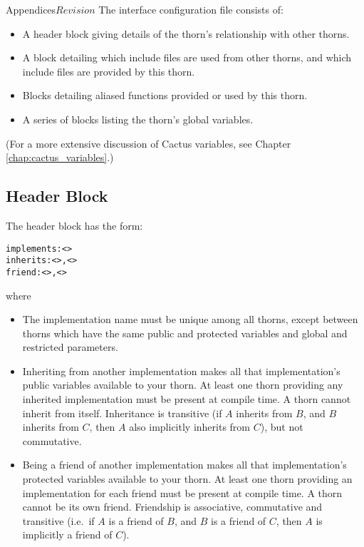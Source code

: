 \begin{cactuspart}{Appendices}{}{$Revision$}
The interface configuration file consists of:
\begin{itemize}
\item A header block giving details of the thorn's relationship with
other thorns.
\item A block detailing which include files are used from other
thorns, and which include files are provided by this thorn.
\item Blocks detailing aliased functions provided or used by this thorn.
\item A series of blocks listing the thorn's global variables.
\end{itemize}
(For a more extensive discussion of Cactus variables, see Chapter
\ref{chap:cactus_variables}.)

\subsection{Header Block}
The header block has the form:
\begin{alltt}
implements: <>
inherits: <>, <>
friend: <>, <>
\end{alltt}
where
\begin{itemize}
\item{} The implementation name must be unique among all thorns, except
        between thorns which have the same public and protected variables and
        global and restricted parameters.
\item{} Inheriting from another implementation makes all that implementation's
        public variables available to your thorn. At least one thorn
        providing any inherited implementation must be present at compile time.
        A thorn cannot inherit from itself. Inheritance is transitive
	(if $A$ inherits from $B$, and $B$ inherits from $C$, then
	$A$ also implicitly inherits from $C$),
	but not commutative.
\item{} Being a friend of another implementation makes all that
        implementation's protected variables available to your thorn.
	At least one thorn providing an implementation for each friend
	must be present at compile time.
	A thorn cannot be its own friend.
	Friendship is associative,
	commutative
	and transitive (i.e.~if $A$ is a friend of $B$,
	and $B$ is a friend of $C$, then $A$ is implicitly a friend of $C$).
\end{itemize}


\end{cactuspart}
